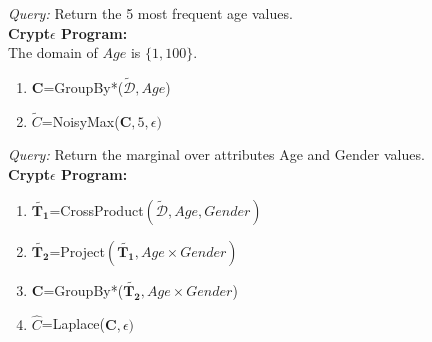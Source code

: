 \begin{exmp}\textit{Query: } Return the 5 most frequent age values.\\\textbf{Crypt$\epsilon$ Program:}\\ The domain of $Age$ is $\{1,100\}$.\end{exmp}\begin{enumerate} \item $\mathbf{C}$=\textsf{GroupBy*}($\boldsymbol{\tilde{\mathcal{D}}},Age$)   \item $\tilde{C}$=\textsf{NoisyMax}($\mathbf{C},5,\epsilon)$\end{enumerate}
\begin{exmp}\textit{Query: } Return the marginal over attributes Age and Gender values.\\\textbf{Crypt$\epsilon$ Program:}\end{exmp} \begin{enumerate} \item $\tilde{\mathbf{T_1}}$=\textsf{CrossProduct}$(\boldsymbol{\tilde{\mathcal{D}}},Age,Gender)$ \item $\tilde{\mathbf{T_2}}$=\textsf{Project}$(\tilde{\mathbf{T_1}}, Age \times Gender)$\item  $\mathbf{C}$=\textsf{GroupBy*}($\tilde{\mathbf{T_2}},Age \times Gender $)   \item $\hat{C}$=\textsf{Laplace}($\mathbf{C},\epsilon)$\end{enumerate}

